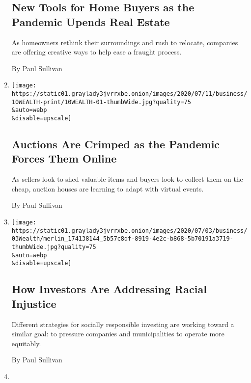 \begin{enumerate}
{  \subsection{New Tools for Home Buyers as the Pandemic Upends Real
  Estate}\label{new-tools-for-home-buyers-as-the-pandemic-upends-real-estate}}

  As homeowners rethink their surroundings and rush to relocate,
  companies are offering creative ways to help ease a fraught process.

  By Paul Sullivan
\item
  \href{/2020/07/10/your-money/auctions-wealth-coronavirus.html}{}

  \texttt{[image: https://static01.graylady3jvrrxbe.onion/images/2020/07/11/business/10WEALTH-print/10WEALTH-01-thumbWide.jpg?quality=75\\\&auto=webp\\\&disable=upscale]}

  \hypertarget{auctions-are-crimped-as-the-pandemic-forces-them-online}{%
  \subsection{Auctions Are Crimped as the Pandemic Forces Them
  Online}\label{auctions-are-crimped-as-the-pandemic-forces-them-online}}

  As sellers look to shed valuable items and buyers look to collect them
  on the cheap, auction houses are learning to adapt with virtual
  events.

  By Paul Sullivan
\item
  \href{/2020/07/03/your-money/investors-racial-injustice.html}{}

  \texttt{[image: https://static01.graylady3jvrrxbe.onion/images/2020/07/03/business/03Wealth/merlin\_174138144\_5b57c8df-8919-4e2c-b868-5b70191a3719-thumbWide.jpg?quality=75\\\&auto=webp\\\&disable=upscale]}

  \hypertarget{how-investors-are-addressing-racial-injustice}{%
  \subsection{How Investors Are Addressing Racial
  Injustice}\label{how-investors-are-addressing-racial-injustice}}

  Different strategies for socially responsible investing are working
  toward a similar goal: to pressure companies and municipalities to
  operate more equitably.

  By Paul Sullivan
\item
  \href{/2020/06/26/your-money/philanthropy-pandemic-coronavirus.html}{}


\end{enumerate}
